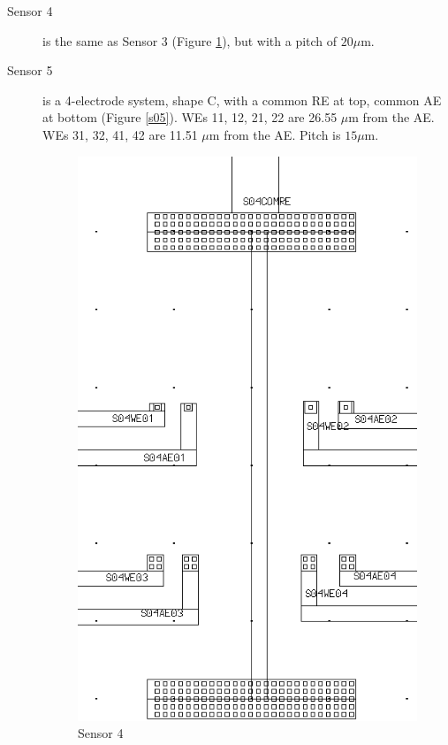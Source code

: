 \begin{description}
\item[Sensor 4] is the same as Sensor 3 (Figure \ref{s04}), but with a pitch of $20 \mu \mathrm{m}$.
\item[Sensor 5] is a 4-electrode system, shape C, with a common RE at top, common AE at bottom (Figure \ref{s05}). WEs 11, 12, 21, 22 are 26.55 $\mu \mathrm{m}$ from the AE. WEs 31, 32, 41, 42 are 11.51 $\mu \mathrm{m}$ from the AE. Pitch is $15 \mu \mathrm{m}$.

\begin{figure}
	\begin{minipage}{0.5\linewidth}
		\centering
		\includegraphics[width=0.6\linewidth]{figures/s04.png}
		\caption{Sensor 4}
		\label{s04}
	\end{minipage}
	\begin{minipage}{0.5\linewidth}
		\centering

\end{minipage}
\end{figure}
\end{description}
